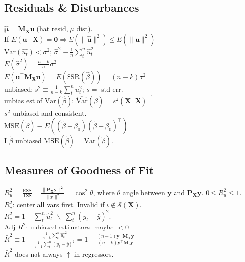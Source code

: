 \subsection*{Residuals \& Disturbances}
$\mathbf{\hat{\mu}} = \mathbf{M_X u}$ (hat resid, $\mu$ dist).\\
If $E(\mathbf{u}\mid \mathbf{X}) = \mathbf{0} \Rightarrow E(\lVert \mathbf{\hat{u}} \rVert ^2) \leq E(\lVert \mathbf{u} \rVert ^2)$\\
$\text{Var}(\hat{u_t}) < \sigma^2$; $\hat{\sigma}^2 \equiv \frac{1}{n} \sum_{t}^{n} \hat{u}_t ^2$\\
$E(\hat{\sigma}^2) = \frac{n-k}{n}\sigma^2$\\
$E(\mathbf{u^{\top}M_X u}) = E(\text{SSR}(\hat{\beta})) = (n-k)\sigma^2$\\
unbiased: $s^2 \equiv \frac{1}{n-k}\sum_{t}^{n} u_t ^2$; $s=$ std err.\\
unbias est of $\text{Var}(\hat{\beta})$: $\widehat{\text{Var}}(\hat{\beta})=s^2(\mathbf{X^{\top}X})^{-1}$\\
$s^2$ unbiased and consistent.\\
$\text{MSE}(\tilde{\beta}) \equiv E((\tilde{\beta} - \beta_0)(\tilde{\beta} - \beta_0)^{\top})$\\
I $\tilde{\beta}$ unbiased $\text{MSE}(\tilde{\beta}) = \text{Var}(\tilde{\beta})$.
\subsection*{Measures of Goodness of Fit}
$R_{u}^2 = \frac{\text{ESS}}{\text{TSS}}= \frac{\lVert \mathbf{P_X y \rVert^2}}{\lVert \mathbf{y} \rVert^2} = \cos^2 \theta$, where $\theta$ angle between $\mathbf{y}$ and $\mathbf{P_X y}$.
$0 \leq R^2_{u} \leq 1$.\\
$R_{c}^2$: center all vars first.
Invalid if $\iota \notin \mathcal{S}(\mathbf{X})$.\\
$R_{c}^2 = 1 - \sum_{t}^{n} \hat{u}_t ^2 \; \backslash \; \sum_{t}^{n} (y_t - \bar{y})^2$.\\
Adj $R^2$: unbiased estimators.
maybe $< 0$.\\
$\bar{R}^2 \equiv 1- \frac{\frac{1}{n-k}\sum_{t}^{n} \hat{u_t}^2}{\frac{1}{n-1}\sum_{t}^{n}(y_t - \bar{y})^2} = 1 - \frac{(n-1)\mathbf{y^{\top}M_X y}}{(n-k)\mathbf{y^{\top}M_\iota y}}$\\
$\bar{R}^2$ does not always $\uparrow$ in regressors.
